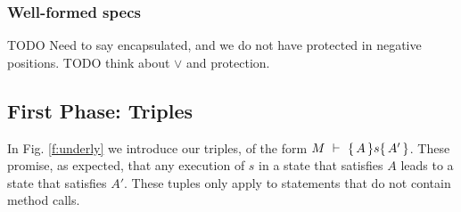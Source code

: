  \subsubsection{Well-formed specs}
 TODO Need to say encapsulated, and we do not have protected in negative positions. TODO think about $\vee$ and protection.

%
%
%
%
%
%
%

\subsection{First Phase: Triples}

In  Fig. \ref{f:underly} we introduce our triples, of the form ${   M\ \vdash\ \{\,A\, \} s \{\,A'\, \}}$. 
These promise, as expected, that any execution of $s$ in a state that satisfies $A$ leads to a state that satisfies $A'$.
These tuples only apply to statements that do not contain method calls.

